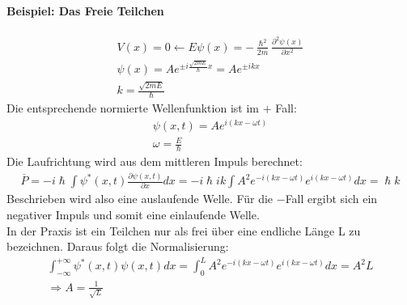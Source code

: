 \documentclass[10pt,a4paper]{article}
\begin{document}
\paragraph{Beispiel: Das Freie Teilchen}
\begin{align}
V(x)= 0 \leftarrow E\psi(x) = -\frac{\hslash^2}{2m}\frac{\partial^2\psi(x)}{\partial x^2}\\
\psi(x)=A e^{\pm i \frac{\sqrt{2mE}}{\hslash}x} = Ae^{\pm ikx}\\
k=\frac{\sqrt{2mE}}{\hslash}
\end{align}
Die entsprechende normierte Wellenfunktion ist im $+$ Fall:
\begin{align}
\psi(x,t)=Ae^{i(kx-\omega t)}\\
\omega= \frac{E}{\hslash}
\end{align}
Die Laufrichtung wird aus dem mittleren Impuls berechnet:
\begin{align}
\overline{P}=-i\hslash \int \psi^*(x,t) \frac{\partial \psi(x,t)}{\partial x} dx =- i \hslash i k \int A^2 e^{-i(kx-\omega t)}e^{i(kx-\omega t)}dx = \hslash k
\end{align}
Beschrieben wird also eine auslaufende Welle. Für die $-$Fall ergibt sich ein negativer Impuls und somit eine einlaufende Welle.\\
In der Praxis ist ein Teilchen nur als frei über eine endliche Länge L zu bezeichnen. Daraus folgt die Normalisierung:
\begin{align}
\int_{-\infty}^{+\infty} \psi^*(x,t) \psi(x,t)dx=\int_0^L A^2 e^{-i(kx-\omega t)}e^{i(kx-\omega t)}dx = A^2L\\ \Rightarrow A=\frac{1}{\sqrt{L}}
\end{align}
\end{document}
